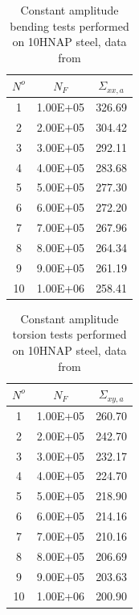 \documentclass[3p,times,procedia,number]{elsarticle}
\begin{document}
\begin{table}[!h]
	\centering
	\begin{tabular}{ccc}
		\hline
		$N^o$ & $N_{F}$  & $\Sigma_{xx,a}$ \\ \hline
		1     & 1.00E+05 & 326.69     \\
		2     & 2.00E+05 & 304.42     \\
		3     & 3.00E+05 & 292.11     \\
		4     & 4.00E+05 & 283.68     \\
		5     & 5.00E+05 & 277.30     \\
		6     & 6.00E+05 & 272.20     \\
		7     & 7.00E+05 & 267.96     \\
		8     & 8.00E+05 & 264.34     \\
		9     & 9.00E+05 & 261.19     \\
		10    & 1.00E+06 & 258.41     \\ \hline
	\end{tabular}
	\caption{Constant amplitude bending tests performed on 10HNAP steel, data from \cite{VIDAL1996}}
	\label{tab.10HNAPbending}
\end{table}

\begin{table}[!h]
	\centering
	\begin{tabular}{ccc}
		\hline
		$N^o$ & $N_{F}$  & $\Sigma_{xy,a}$ \\ \hline
		1     & 1.00E+05 & 260.70          \\
		2     & 2.00E+05 & 242.70          \\
		3     & 3.00E+05 & 232.17          \\
		4     & 4.00E+05 & 224.70          \\
		5     & 5.00E+05 & 218.90          \\
		6     & 6.00E+05 & 214.16          \\
		7     & 7.00E+05 & 210.16          \\
		8     & 8.00E+05 & 206.69          \\
		9     & 9.00E+05 & 203.63          \\
		10    & 1.00E+06 & 200.90          \\ \hline
	\end{tabular}
	\caption{Constant amplitude torsion tests performed on 10HNAP steel, data from \cite{VIDAL1996}}
	\label{tab.10HNAPtorsion}
\end{table}
\end{document}
